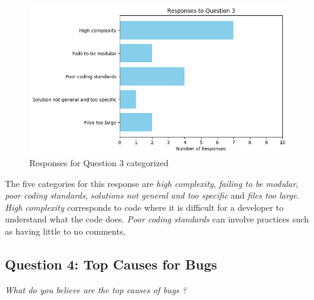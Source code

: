\documentclass[../main.tex]{subfiles}
\begin{document}
\begin{figure}[H]
    \centering
    \includegraphics[scale=0.7]{images/Results/RQ2/RQ2_question_3.png}
    \caption{Responses for Question 3 categorized}
    \label{fig:rq2Image3}
\end{figure}

The five categories for this response are \textit{high complexity}, \textit{failing to be modular}, \textit{poor coding standards}, \textit{solutions not general and too specific} and \textit{files too large}. \textit{High complexity} corresponds to code where it is difficult for a developer to understand what the code does. \textit{Poor coding standards} can involve practices such as having little to no comments, 

\subsection{Question 4: Top Causes for Bugs}

\textit{What do you believe are the top causes of bugs ? }
\end{document}
